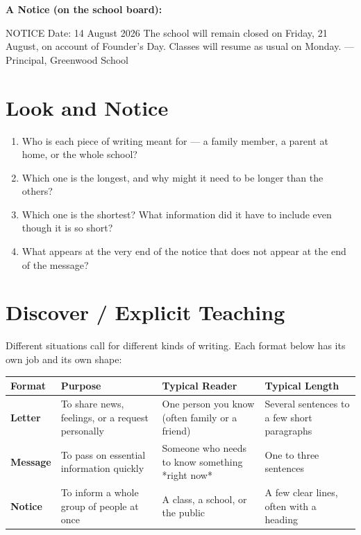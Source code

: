 \textbf{A Notice (on the school board):}
\begin{tcolorbox}[colback=white, colframe=gray!20, sharp corners, boxsep=0pt, left=5pt, right=5pt, top=5pt, bottom=5pt, fontupper=\ttfamily, breakable]
NOTICE
Date: 14 August 2026
The school will remain closed on Friday, 21 August, on account of Founder's Day. Classes will resume as usual on Monday.
--- Principal, Greenwood School
\end{tcolorbox}

\section{Look and Notice}
\begin{thinkbox}
\begin{enumerate}
    \item Who is each piece of writing meant for — a family member, a parent at home, or the whole school?
    \item Which one is the longest, and why might it need to be longer than the others?
    \item Which one is the shortest? What information did it have to include even though it is so short?
    \item What appears at the very end of the notice that does not appear at the end of the message?
\end{enumerate}
\end{thinkbox}

\section{Discover / Explicit Teaching}
Different situations call for different kinds of writing. Each format below has its own job and its own shape:

\begin{table}[h!]
\centering
\begin{tabular}{|l|p{4cm}|p{4cm}|l|}
\hline
\textbf{Format} & \textbf{Purpose} & \textbf{Typical Reader} & \textbf{Typical Length} \\
\hline
\textbf{Letter} & To share news, feelings, or a request personally & One person you know (often family or a friend) & Several sentences to a few short paragraphs \\
\textbf{Message} & To pass on essential information quickly & Someone who needs to know something *right now* & One to three sentences \\
\textbf{Notice} & To inform a whole group of people at once & A class, a school, or the public & A few clear lines, often with a heading \\
\hline
\end{tabular}
\end{table}

